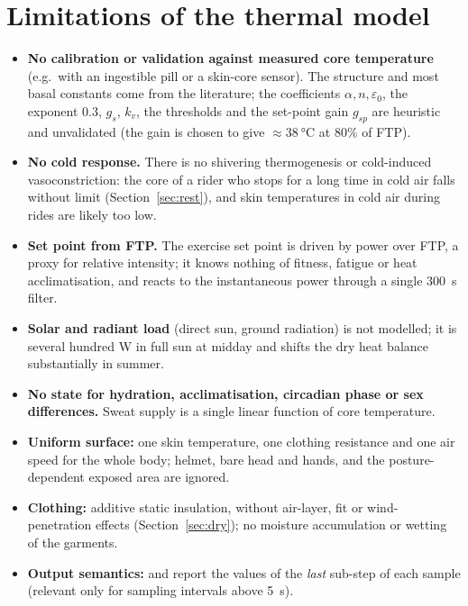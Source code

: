 \documentclass[11pt,a4paper]{article}
\newcommand{\code}[1]{\texttt{\detokenize{#1}}}
\begin{document}
\section{Limitations of the thermal model}
\label{sec:limits-thermal}
\begin{itemize}
 \item \textbf{No calibration or validation against measured core temperature} (e.g.\ with an ingestible pill or a skin-core sensor). The structure and most basal constants come from the literature; the coefficients \(\alpha,n,\varepsilon_0\), the exponent \(0.3\), \(g_s\), \(k_v\), the thresholds and the set-point gain \(g_{sp}\) are heuristic and unvalidated (the gain is chosen to give \(\approx\SI{38}{\degreeCelsius}\) at \(80\%\) of FTP).
 \item \textbf{No cold response.} There is no shivering thermogenesis or cold-induced vasoconstriction: the core of a rider who stops for a long time in cold air falls without limit (Section~\ref{sec:rest}), and skin temperatures in cold air during rides are likely too low.
 \item \textbf{Set point from FTP.} The exercise set point is driven by power over FTP, a proxy for relative intensity; it knows nothing of fitness, fatigue or heat acclimatisation, and reacts to the instantaneous power through a single \SI{300}{s} filter.
 \item \textbf{Solar and radiant load} (direct sun, ground radiation) is not modelled; it is several hundred \si{W} in full sun at midday and shifts the dry heat balance substantially in summer.
 \item \textbf{No state for hydration, acclimatisation, circadian phase or sex differences.} Sweat supply is a single linear function of core temperature.
 \item \textbf{Uniform surface:} one skin temperature, one clothing resistance and one air speed for the whole body; helmet, bare head and hands, and the posture-dependent exposed area are ignored.
 \item \textbf{Clothing:} additive static insulation, without air-layer, fit or wind-penetration effects (Section~\ref{sec:dry}); no moisture accumulation or wetting of the garments.
 \item \textbf{Output semantics:} \code{heat_generated_W} and \code{heat_lost_W} report the values of the \emph{last} sub-step of each sample (relevant only for sampling intervals above \SI{5}{s}).
\end{itemize}
\end{document}
